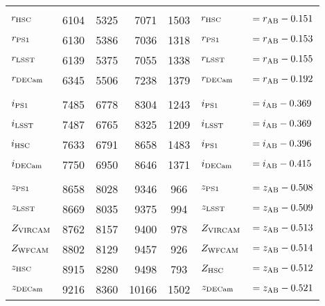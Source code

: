 \documentclass[usenatbib]{mnras}
\begin{document}
\begin{table*}
\begin{center}
\begin{tabular}{l r r r  c l l}
      &&&&&&\\
      $r_{\rm HSC}$         &    6104     &   5325    &   7071	&   1503       & $r_{\rm HSC}   $       &$     = r_{\rm AB} - 0.151 $ \\
      $r_{\rm PS1}$         &    6130    & 	  5386    &    7036   &   1318       &  $r_{\rm PS1}   $       &$     = r_{\rm AB} - 0.153 $ \\ %
      $r_{\rm LSST}$       &     6139    &	  5375    &    7055   &   1338      &  $r_{\rm LSST}   $       &$    = r_{\rm AB} - 0.155 $ \\	
      $r_{\rm DECam}$   &      6345    &    5506    &    7238   &   1379      &  $r_{\rm DECam}$       &$   = r_{\rm AB} - 0.192 $ \\	     
      &&&&&&\\
      $i_{\rm PS1}$         &    7485    &     6778    &    8304   &   1243      &  $i_{\rm PS1}    $       &$   = i_{\rm AB} - 0.369 $ \\  %
      $i_{\rm LSST}$       &     7487    &	  6765    &     8325   &   1209      &  $i_{\rm LSST}   $       &$    = i_{\rm AB} - 0.369 $ \\   %
      $i_{\rm HSC}$         &   7633    &     6791    &     8658	&   1483       &  $i_{\rm PS1}    $       &$   = i_{\rm AB} - 0.396 $ \\  %
      $i_{\rm DECam}$   &      7750   &	  6950    &     8646    &   1371      &  $i_{\rm DECam} $     &$  = i_{\rm AB} - 0.415 $        \\	   
      &&&&&&\\
      $z_{\rm PS1}$        &    8658    &	 8028    &      9346   &      966      &  $z_{\rm PS1}   $      &$    = z_{\rm AB} - 0.508 $       \\
      $z_{\rm LSST}$      &     8669   & 	 8035    &      9375   &      994     &   $z_{\rm LSST}  $      &$    = z_{\rm AB} - 0.509 $     \\
      $Z_{\rm VIRCAM}$  &     8762   & 	 8157    &      9400   &      978    &   $Z_{\rm VIRCAM}  $   &$    = z_{\rm AB} - 0.513 $     \\
      $Z_{\rm WFCAM}$  &     8802   & 	 8129    &      9457   &      926    &   $Z_{\rm WFCAM}  $   &$    = z_{\rm AB} - 0.514 $     \\
      $z_{\rm HSC}$        &    8915  &   	8280     &      9498	&    793      & 	$Z_{\rm HSC} $         &$    = z_{\rm AB} - 0.512$     \\
      $z_{\rm DECam}$  &      9216   & 	 8360    &    10166   &   1502      &  $z_{\rm DECam} $     &$   = z_{\rm AB} - 0.521 $ \\

\end{tabular}
\end{center}
\end{table*}
\end{document}
